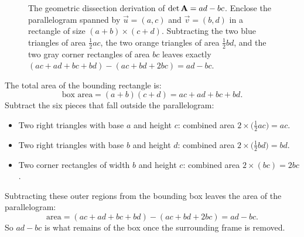 \begin{figure}[H]
\caption{The geometric dissection derivation of $\det\mathbf{A}=ad-bc$. Enclose the
parallelogram spanned by $\vec{u}=(a,c)$ and $\vec{v}=(b,d)$ in a rectangle of size
$(a+b)\times(c+d)$. Subtracting the two blue triangles of area $\frac{1}{2}ac$, the
two orange triangles of area $\frac{1}{2}bd$, and the two gray corner rectangles of
area $bc$ leaves exactly $(ac+ad+bc+bd) - (ac+bd+2bc) = ad-bc$.}
\label{ch21:fig-shear-area}
\end{figure}

The total area of the bounding rectangle is:
\[
  \text{box area} = (a+b)(c+d) = ac + ad + bc + bd.
\]
Subtract the six pieces that fall outside the parallelogram:
\begin{itemize}
  \item Two right triangles with base $a$ and height $c$: combined area $2\times\big(\tfrac{1}{2}ac\big) = ac$.
  \item Two right triangles with base $b$ and height $d$: combined area $2\times\big(\tfrac{1}{2}bd\big) = bd$.
  \item Two corner rectangles of width $b$ and height $c$: combined area $2\times(bc) = 2bc$.
\end{itemize}
Subtracting these outer regions from the bounding box leaves the area of the parallelogram:
\[
  \text{area} = (ac + ad + bc + bd) - (ac + bd + 2bc) = ad - bc.
\]
So $ad-bc$ is what remains of the box once the surrounding frame is removed.

